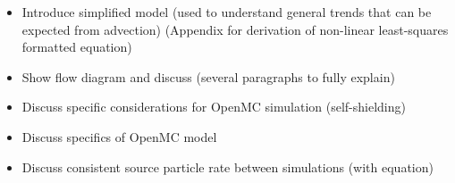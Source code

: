 
\begin{itemize}
    \item Introduce simplified model (used to understand general trends that can be expected from advection) (Appendix for derivation of non-linear least-squares formatted equation)
    \item Show flow diagram and discuss (several paragraphs to fully explain)
    \item Discuss specific considerations for OpenMC simulation (self-shielding)
    \item Discuss specifics of OpenMC model
    \item Discuss consistent source particle rate between simulations (with equation)
\end{itemize}


